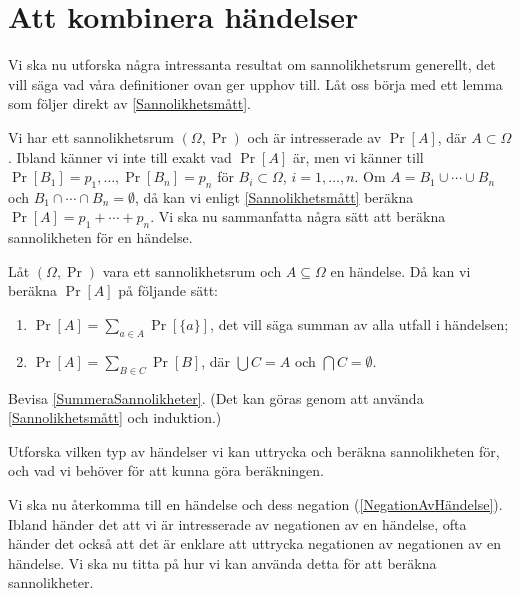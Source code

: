 \section{Att kombinera händelser}

Vi ska nu utforska några intressanta resultat om sannolikhetsrum generellt, det 
vill säga vad våra definitioner ovan ger upphov till.
Låt oss börja med ett lemma som följer direkt av \cref{Sannolikhetsmått}.

Vi har ett sannolikhetsrum \((\Omega, \Pr)\) och är intresserade av \(\Pr[A]\), 
där \(A\subset \Omega\).
Ibland känner vi inte till exakt vad \(\Pr[A]\) är, men vi känner till 
\(\Pr[B_1] = p_1, \dotsc, \Pr[B_n] = p_n\) för \(B_i\subset \Omega\), \(i = 1, 
  \dotsc, n\).
Om \(A = B_1\cup \dotsb\cup B_n\) och \(B_1\cap \dotsb\cap B_n = \emptyset\), 
då kan vi enligt \cref{Sannolikhetsmått} beräkna \(\Pr[A] = p_1 + \dotsb 
  + p_n\).
Vi ska nu sammanfatta några sätt att beräkna sannolikheten för en händelse.

\begin{lemma}\label{SummeraSannolikheter}
  Låt \((\Omega, \Pr)\) vara ett sannolikhetsrum och \(A\subseteq \Omega\) en 
  händelse.
  Då kan vi beräkna \(\Pr[A]\) på följande sätt:
  \begin{enumerate}
    \item \(\Pr[A] = \sum_{a\in A} \Pr[\{a\}]\), det vill säga summan av alla 
      utfall i händelsen;
    \item \(\Pr[A] = \sum_{B\in C} \Pr[B]\), där \(\bigcup C = A\) och 
      \(\bigcap C = \emptyset\).
  \end{enumerate}
\end{lemma}

\begin{exercise}
  Bevisa \cref{SummeraSannolikheter}.
  (Det kan göras genom att använda \cref{Sannolikhetsmått} och induktion.)
\end{exercise}

\begin{exercise}
  Utforska vilken typ av händelser vi kan uttrycka och beräkna sannolikheten 
  för, och vad vi behöver för att kunna göra beräkningen.
\end{exercise}

Vi ska nu återkomma till en händelse och dess negation 
(\cref{NegationAvHändelse}).
Ibland händer det att vi är intresserade av negationen av en händelse, ofta 
händer det också att det är enklare att uttrycka negationen av negationen av en
händelse.
Vi ska nu titta på hur vi kan använda detta för att beräkna sannolikheter.

